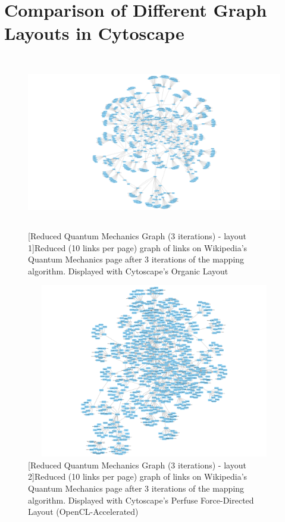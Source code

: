 \documentclass[man, 12pt, floatsintext, donotrepeattitle]{apa6}
\begin{document}
\section{Comparison of Different Graph Layouts in Cytoscape}
\begin{figure}[h]
  \centering
    \includegraphics[width=6in, height=3in]{Resources/10max/3iterations/QuantumMechanics_v_717_e_1009_a.png}
  [Reduced Quantum Mechanics Graph (3 iterations) - layout 1]{Reduced (10 links per page) graph of links on Wikipedia's Quantum Mechanics page after 3
  iterations of the mapping algorithm.  Displayed with Cytoscape's Organic Layout
    \label{figQuantumMechanics_v_717_e_1009_a}}
\end{figure}
\begin{figure}[h]
  \centering
    \includegraphics[width=6in, height=3in]{Resources/10max/3iterations/QuantumMechanics_v_717_e_1009_b.png}
  [Reduced Quantum Mechanics Graph (3 iterations) - layout 2]{Reduced (10 links per page) graph of links on Wikipedia's Quantum Mechanics page after 3
  iterations of the mapping algorithm.  Displayed with Cytoscape's Perfuse Force-Directed Layout (OpenCL-Accelerated)
    \label{figQuantumMechanics_v_717_e_1009_b}}
\end{figure}
\end{document}
